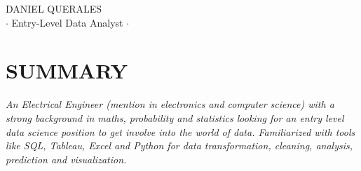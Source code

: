 \documentclass[10pt]{article} %
\def\myname{DANIEL QUERALES}
\def\position{$\cdot$ Entry-Level Data Analyst $\cdot$}
\begin{document}
\thispagestyle{empty}

\begin{center}
{\Huge \myname} \\ %
{\large \position}
\end{center}



\section*{SUMMARY}

\emph{An Electrical Engineer (mention in electronics and computer science) with a strong background in maths, probability and statistics looking for an entry level data science position to get involve into the world of data. Familiarized with tools like SQL, Tableau, Excel and Python for data transformation, cleaning, analysis, prediction and visualization.}


%
%
\end{document}

